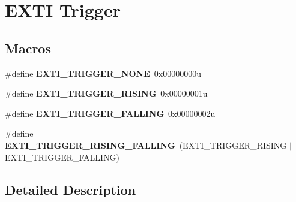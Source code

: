 \hypertarget{group___e_x_t_i___trigger}{}\section{E\+X\+TI Trigger}
\label{group___e_x_t_i___trigger}
\subsection*{Macros}
\begin{DoxyCompactItemize}
\item 
\mbox{\label{group___e_x_t_i___trigger_gab0a4e8ed945992cb0cf071efe85748c8}} 
\#define {\bfseries E\+X\+T\+I\+\_\+\+T\+R\+I\+G\+G\+E\+R\+\_\+\+N\+O\+NE}~0x00000000u
\item 
\mbox{\label{group___e_x_t_i___trigger_ga648bd5d6c2bebd85b5ea85f8af9a2ccc}} 
\#define {\bfseries E\+X\+T\+I\+\_\+\+T\+R\+I\+G\+G\+E\+R\+\_\+\+R\+I\+S\+I\+NG}~0x00000001u
\item 
\mbox{\label{group___e_x_t_i___trigger_ga7461c33165994159edf79a095c227937}} 
\#define {\bfseries E\+X\+T\+I\+\_\+\+T\+R\+I\+G\+G\+E\+R\+\_\+\+F\+A\+L\+L\+I\+NG}~0x00000002u
\item 
\mbox{\label{group___e_x_t_i___trigger_ga481cea6a2aafe107e5657b65887c81d5}} 
\#define {\bfseries E\+X\+T\+I\+\_\+\+T\+R\+I\+G\+G\+E\+R\+\_\+\+R\+I\+S\+I\+N\+G\+\_\+\+F\+A\+L\+L\+I\+NG}~(E\+X\+T\+I\+\_\+\+T\+R\+I\+G\+G\+E\+R\+\_\+\+R\+I\+S\+I\+NG $\vert$ E\+X\+T\+I\+\_\+\+T\+R\+I\+G\+G\+E\+R\+\_\+\+F\+A\+L\+L\+I\+NG)
\end{DoxyCompactItemize}


\subsection{Detailed Description}
